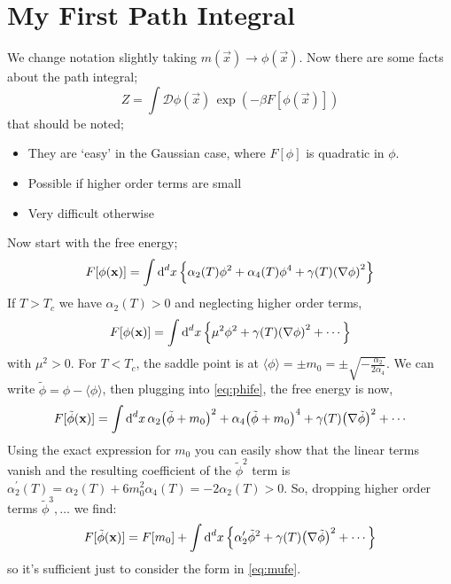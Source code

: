 \section{My First Path Integral}
We change notation slightly taking $m(\vec x) \rightarrow \phi(\vec x)$. Now there are some facts about the path integral;
\begin{equation}
Z = \int{\mathcal{D}\phi(\vec x) \, \exp\left(-\beta F[\phi(\vec x)]\right)}
\end{equation}
that should be noted;
\begin{itemize}
\item They are `easy' in the Gaussian case, where $F[\phi]$ is quadratic in $\phi$.
\item Possible if higher order terms are small
\item Very difficult otherwise
\end{itemize}
Now start with the free energy;
\begin{equation}
\label{eq:phife}
F[\phi(\vec x)] = \int{ \upd{^d x} \left\{ \alpha_2(T)\phi^2 + \alpha_4(T) \phi^4 + \gamma(T) \left(\nabla \phi \right)^2 \right\} }
\end{equation}
If $T > T_c$ we have $\alpha_2(T) > 0$ and neglecting higher order terms,
\begin{equation}
\label{eq:mufe}
F[\phi(\vec x)] = \int{ \upd{^d x} \left\{ \mu^2 \phi^2 + \gamma(T) \left(\nabla \phi \right)^2 + \cdots \right\} }
\end{equation}
with $\mu^2 > 0$. For $T < T_c$, the saddle point is at $\langle \phi \rangle = \pm m_0 = \pm \sqrt{-\tfrac{\alpha_2}{2\alpha_4}}$. We can write $\tilde{\phi} = \phi - \langle \phi \rangle$, then plugging into \eqref{eq:phife}, the free energy is now,
\begin{dmath}
F[\tilde{\phi}(\vec x)] = \int{\upd{^d x} \alpha_2 \left(\tilde{\phi} + m_0\right)^2 +  \alpha_4 \left(\tilde{\phi} + m_0\right)^4 + \gamma(T) \left(\nabla \tilde{\phi} \right)^2 + \cdots}
\end{dmath}
Using the exact expression for $m_0$ you can easily show that the linear terms vanish and the resulting coefficient of the $\tilde{\phi}^2$ term is $\alpha_2^{\prime}(T) = \alpha_2(T) + 6 m_0^2 \alpha_4(T) = -2 \alpha_2(T) > 0$. So, dropping higher order terms $\tilde{\phi}^3, \ldots$ we find:
\begin{equation}
F[\tilde{\phi}(\vec x)] = F[m_0] + \int{ \upd{^d x} \left\{ \alpha_2^{\prime} \tilde{\phi}^2 + \gamma(T) \left(\nabla \tilde{\phi} \right)^2 + \cdots \right\} }
\end{equation}
so it's sufficient just to consider the form in \eqref{eq:mufe}.









